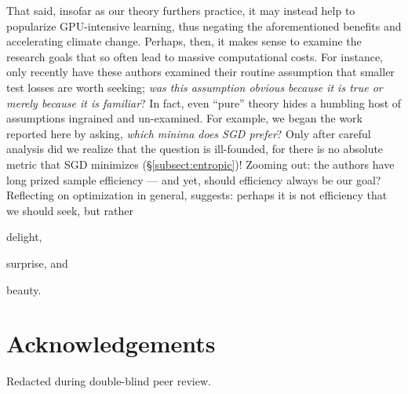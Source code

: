 \documentclass{article}
\theoremstyle{plain}
\theoremstyle{definition}
\begin{document}
    That said, insofar as our theory furthers practice, it may instead help to
    popularize GPU-intensive learning, thus negating the
    aforementioned benefits and accelerating climate change.
    Perhaps, then, it makes sense to examine the research goals that so often
    lead to massive computational costs.  For instance, only recently have
    these authors examined their routine assumption that smaller test losses
    are worth seeking; \emph{was this assumption obvious because it is true or
    merely because it is familiar}?
    In fact, even ``pure'' theory hides a humbling host of assumptions
    ingrained and un-examined.  For example, we began the work reported here by
    asking, \textit{which minima does SGD prefer}?  Only after careful analysis
    did we realize that the question is ill-founded, for there is no absolute
    metric that SGD minimizes (\S\ref{subsect:entropic})! 
    Zooming out: the authors have long prized sample efficiency --- and yet,
    should efficiency always be our goal?  Reflecting on
    optimization in general, \cite{ar19} suggests: perhaps it is not efficiency
    that we should seek, but rather
    \par \hfill delight, \phantom{surprise, and beauty.~~~~}
    \par \hfill surprise, and \phantom{beauty.~~}
    \par \hfill beauty.


\section*{Acknowledgements}

    Redacted during double-blind peer review.
\end{document}
